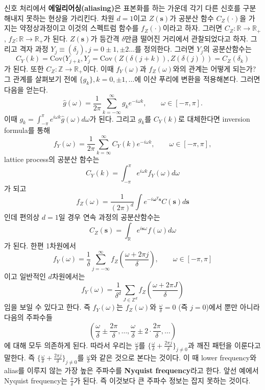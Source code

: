 \documentclass[b5paper,]{scrbook}
\theoremstyle{plain}
\theoremstyle{definition}
\numberwithin{equation}{section}
\begin{document}
신호 처리에서 \textbf{에일리어싱(aliasing)}은 표본화를 하는 가운데 각기 다른 신호를 구분해내지 못하는 현상을 가리킨다. 차원 \(d=1\)이고 \(Z(\mathbf{s})\)가 공분산 함수 \(C_{Z}(\cdot)\)을 가지는 약정상과정이고 이것의 스펙트럼 함수를 \(f_{Z}(\cdot)\)이라고 하자. 그러면 \(C_{Z}:\mathbb{R}\rightarrow\mathbb{R}_{+}\), \(f_{Z}:\mathbb{R}\rightarrow\mathbb{R}_{+}\)가 된다. \(Z(\mathbf{s})\)가 등간격 \(\delta\)만큼 떨어진 거리에서 관찰되었다고 하자. 그리고 격자 과정 \(Y_{j}\equiv (\delta_{j}),j=0\pm 1, \pm2 \ldots\)를 정의한다. 그러면 \(Y_{j}\)의 공분산함수는
\[C_{Y}(k)=\text{Cov}(Y_{j+k},Y_{j}=\text{Cov}(Z(\delta(j+k)), Z(\delta(j)))= C_{Z}(\delta_{k})\]
가 된다. 또한 \(C_{Z}:\mathbb{Z}\rightarrow\mathbb{R}_{+}\)이다. 이때 \(f_{Y}(\omega)\)과 \(f_{Z}(\omega)\)와의 관계는 어떻게 되는가? 그 관계를 살펴보기 전에 \(\{g_{k}\}, k=0,\pm 1, \ldots\)에 이산 푸리에 변환을 적용해본다. 그러면 다음을 얻는다.
\[\hat{g}(\omega)=\frac{1}{2\pi}\sum_{k=-\infty}^{\infty}g_{k}e^{-i\omega k}, \qquad{\omega \in [-\pi, \pi].}\]
이때 \(g_{k}=\int_{-\pi}^{\pi}e^{i\omega k }\hat{g}(\omega)d\omega\)가 된다. 그리고 \(g_{k}\)를 \(C_{Y}(k)\)로 대체한다면 inversion formula를 통해
\[f_{Y}(\omega)=\frac{1}{2\pi}\sum_{k=\infty}^{\infty}C_{Y}(k)e^{-i\omega k}, \qquad{\omega \in [-\pi, \pi]},\]
lattice process의 공분산 함수는
\[C_{Y}(k)=\int_{-\pi}^{\pi}e^{i\omega k}f_{Y}(\omega)d\omega\]
가 되고
\[f_{Z}(\omega)=\frac{1}{(2\pi)^{d}}\int e^{-i\boldsymbol{\omega}^{T}\mathbf{s}}C(\mathbf{s})d\mathbf{s}\]
인데 편의상 \(d=1\)일 경우 연속 과정의 공분산함수는
\[C_{Z}(\mathbf{s})=\int_{\mathbb{R}}e^{i\mathbf{s}\omega}f(\omega)d\omega \]
가 된다. 한편 1차원에서
\[f_{Y}(\omega)=\frac{1}{\delta}\sum_{j=-\infty}^{\infty}f_{Z}(\frac{\omega + 2\pi j }{\delta}), \qquad{\omega \in [-\pi, \pi]}\]
이고 일반적인 \(d\)차원에서는
\[f_{Y}(\omega)=\frac{1}{\delta^{d}}\sum_{J\in\mathbb{Z}^{d}}f_{Z}(\frac{\omega + 2\pi J}{\delta})\]
임을 보일 수 있다고 한다. 즉 \(f_{Y}(\omega)\)는 \(f_{Z}(\omega)\)와 \(\frac{\omega}{\delta}=0\) (즉 \(j=0\))에서 뿐만 아니라 다음의 주파수들
\[(\frac{\omega}{\delta}\pm \frac{2\pi}{\delta}, \ldots , \frac{\omega}{\delta}\pm 2\cdot\frac{2\pi}{\delta},\ldots)\]
에 대해 모두 의존하게 된다. 따라서 우리는 \(\frac{\omega}{\delta}\)를 \(\{\frac{\omega}{\delta}+ \frac{2\pi j}{\delta} \}_{j\neq 0}\)과 깨진 패턴을 이룬다고 말한다. 즉 \(\{\frac{\omega}{\delta}+ \frac{2\pi j}{\delta} \}_{j\neq 0}\)를 \(\frac{\omega}{\delta}\)와 같은 것으로 본다는 것이다. 이 때 lower frequency와 alias를 이루지 않는 가장 높은 주파수를 \textbf{Nyquist frequency}라고 한다. 앞선 예에서 Nyquist frequency는 \(\frac{\pi}{\delta}\)가 된다. 즉 이것보다 큰 주파수 정보는 잡지 못하는 것이다.
\end{document}
